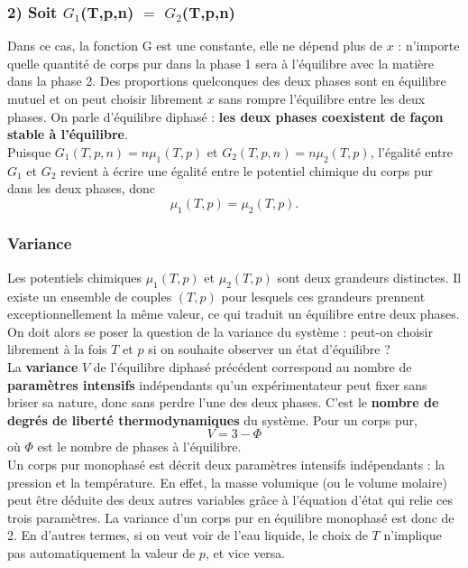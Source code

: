 \documentclass[11pt,a4paper]{report}
\begin{document}
\subsubsection*{2\degree) Soit $G_1$(T,p,n) $=$ $G_2$(T,p,n)}

Dans ce cas, la fonction $\text{G}$ est une constante, elle ne dépend plus de $x$ : n'importe quelle quantité de corps pur dans la phase 1 sera à l'équilibre avec la matière dans la phase 2. Des proportions quelconques des deux phases sont en équilibre mutuel et on peut choisir librement $x$ sans rompre l'équilibre entre les deux phases. On parle d'équilibre diphasé : \textbf{les deux phases coexistent de façon stable à l'équilibre}.\\

Puisque $G_1(T,p,n) = n\mu_1(T,p)$ et $G_2(T,p,n) = n\mu_2(T,p)$, l'égalité entre $G_1$ et $G_2$ revient à écrire une égalité entre le potentiel chimique du corps pur dans les deux phases, donc
\begin{equation}
	\boxed{\mu_1(T,p) = \mu_2(T,p)}.
\end{equation} 

\subsubsection*{Variance}

Les potentiels chimiques $\mu_1(T,p)$ et $\mu_2(T,p)$ sont deux grandeurs distinctes. Il existe un ensemble de couples $(T,p)$ pour lesquels ces grandeurs prennent exceptionnellement la même valeur, ce qui traduit un équilibre entre deux phases. On doit alors se poser la question de la variance du système : peut-on choisir librement à la fois $T$ et $p$ si on souhaite observer un état d'équilibre ?\\

La \textbf{variance} $V$ de l'équilibre diphasé précédent correspond au nombre de \textbf{paramètres intensifs} indépendants qu'un expérimentateur peut fixer sans briser sa nature, donc sans perdre l'une des deux phases. C'est le \textbf{nombre de degrés de liberté thermodynamiques} du système. Pour un corps pur,
\begin{equation}
	\boxed{V = 3 - \Phi}
	\label{eq:variance}
\end{equation}
où $\Phi$ est le nombre de phases à l'équilibre.\\ 

Un corps pur monophasé est décrit deux paramètres intensifs indépendants : la pression et la température. En effet, la masse volumique (ou le volume molaire) peut être déduite des deux autres variables grâce à l'équation d'état qui relie ces trois paramètres. La variance d'un corps pur en équilibre monophasé est donc de 2. En d'autres termes, si on veut voir de l'eau liquide, le choix de $T$ n'implique pas automatiquement la valeur de $p$, et vice versa.\\
\end{document}
